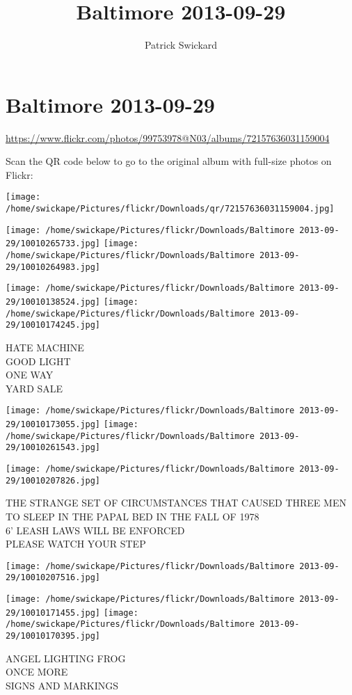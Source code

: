 \documentclass[10pt,letterpaper]{article}
\title{Baltimore 2013-09-29}
\author{Patrick Swickard}
\date{}
\begin{document}
\section*{Baltimore 2013-09-29}

\url{https://www.flickr.com/photos/99753978@N03/albums/72157636031159004}

Scan the QR code below to go to the original album with full-size photos on Flickr:

\texttt{[image: /home/swickape/Pictures/flickr/Downloads/qr/72157636031159004.jpg]}
\pagebreak

\texttt{[image: /home/swickape/Pictures/flickr/Downloads/Baltimore 2013-09-29/10010265733.jpg]}
\texttt{[image: /home/swickape/Pictures/flickr/Downloads/Baltimore 2013-09-29/10010264983.jpg]}

\texttt{[image: /home/swickape/Pictures/flickr/Downloads/Baltimore 2013-09-29/10010138524.jpg]}
\texttt{[image: /home/swickape/Pictures/flickr/Downloads/Baltimore 2013-09-29/10010174245.jpg]}

HATE MACHINE\\
GOOD LIGHT\\
ONE WAY\\
YARD SALE
\pagebreak

\texttt{[image: /home/swickape/Pictures/flickr/Downloads/Baltimore 2013-09-29/10010173055.jpg]}
\texttt{[image: /home/swickape/Pictures/flickr/Downloads/Baltimore 2013-09-29/10010261543.jpg]}

\texttt{[image: /home/swickape/Pictures/flickr/Downloads/Baltimore 2013-09-29/10010207826.jpg]}

THE STRANGE SET OF CIRCUMSTANCES THAT CAUSED THREE MEN TO SLEEP IN THE PAPAL BED IN THE FALL OF 1978\\
6' LEASH LAWS WILL BE ENFORCED\\
PLEASE WATCH YOUR STEP
\pagebreak

\texttt{[image: /home/swickape/Pictures/flickr/Downloads/Baltimore 2013-09-29/10010207516.jpg]}

\vspace{0.25in}
\texttt{[image: /home/swickape/Pictures/flickr/Downloads/Baltimore 2013-09-29/10010171455.jpg]}
\texttt{[image: /home/swickape/Pictures/flickr/Downloads/Baltimore 2013-09-29/10010170395.jpg]}

ANGEL LIGHTING FROG\\
ONCE MORE\\
SIGNS AND MARKINGS
\pagebreak
\end{document}
